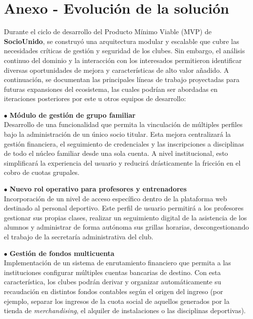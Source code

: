 \section{Anexo - Evolución de la solución}

Durante el ciclo de desarrollo del Producto Mínimo Viable (MVP) de \textbf{SocioUnido}, se construyó una arquitectura modular y escalable que cubre las necesidades críticas de gestión y seguridad de los clubes. Sin embargo, el análisis continuo del dominio y la interacción con los interesados permitieron identificar diversas oportunidades de mejora y características de alto valor añadido. A continuación, se documentan las principales líneas de trabajo proyectadas para futuras expansiones del ecosistema, las cuales podrían ser abordadas en iteraciones posteriores por este u otros equipos de desarrollo:

\vspace{0.3cm}

\noindent $\bullet$ \textbf{Módulo de gestión de grupo familiar}\\
Desarrollo de una funcionalidad que permita la vinculación de múltiples perfiles bajo la administración de un único socio titular. Esta mejora centralizará la gestión financiera, el seguimiento de credenciales y las inscripciones a disciplinas de todo el núcleo familiar desde una sola cuenta. A nivel institucional, esto simplificará la experiencia del usuario y reducirá drásticamente la fricción en el cobro de cuotas grupales.

\vspace{0.3cm}

\noindent $\bullet$ \textbf{Nuevo rol operativo para profesores y entrenadores}\\
Incorporación de un nivel de acceso específico dentro de la plataforma web destinado al personal deportivo. Este perfil de usuario permitirá a los profesores gestionar sus propias clases, realizar un seguimiento digital de la asistencia de los alumnos y administrar de forma autónoma sus grillas horarias, descongestionando el trabajo de la secretaría administrativa del club.

\vspace{0.3cm}

\noindent $\bullet$ \textbf{Gestión de fondos multicuenta}\\
Implementación de un sistema de enrutamiento financiero que permita a las instituciones configurar múltiples cuentas bancarias de destino. Con esta característica, los clubes podrán derivar y organizar automáticamente su recaudación en distintos fondos contables según el origen del ingreso (por ejemplo, separar los ingresos de la cuota social de aquellos generados por la tienda de \textit{merchandising}, el alquiler de instalaciones o las disciplinas deportivas).

